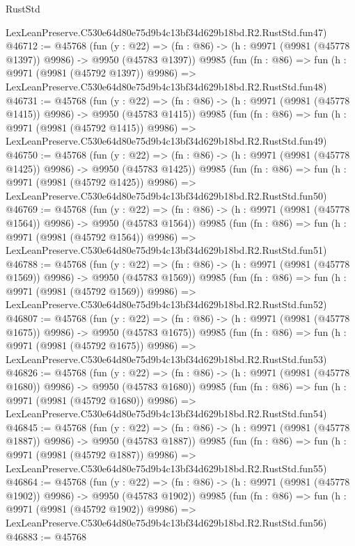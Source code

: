 \begin{lexlean}{RustStd}
\begin{coremodule}
    LexLeanPreserve.C530e64d80e75d9b4c13bf34d629b18bd.R2.RustStd.fun47)
@46712 := @45768
    (fun (y : @22) =>
    (fn : @86) -> (h : @9971 (@9981 (@45778 @1397)) @9986) -> @9950 (@45783 @1397))
    @9985
    (fun (fn : @86) =>
    fun (h : @9971 (@9981 (@45792 @1397)) @9986) =>
    LexLeanPreserve.C530e64d80e75d9b4c13bf34d629b18bd.R2.RustStd.fun48)
@46731 := @45768
    (fun (y : @22) =>
    (fn : @86) -> (h : @9971 (@9981 (@45778 @1415)) @9986) -> @9950 (@45783 @1415))
    @9985
    (fun (fn : @86) =>
    fun (h : @9971 (@9981 (@45792 @1415)) @9986) =>
    LexLeanPreserve.C530e64d80e75d9b4c13bf34d629b18bd.R2.RustStd.fun49)
@46750 := @45768
    (fun (y : @22) =>
    (fn : @86) -> (h : @9971 (@9981 (@45778 @1425)) @9986) -> @9950 (@45783 @1425))
    @9985
    (fun (fn : @86) =>
    fun (h : @9971 (@9981 (@45792 @1425)) @9986) =>
    LexLeanPreserve.C530e64d80e75d9b4c13bf34d629b18bd.R2.RustStd.fun50)
@46769 := @45768
    (fun (y : @22) =>
    (fn : @86) -> (h : @9971 (@9981 (@45778 @1564)) @9986) -> @9950 (@45783 @1564))
    @9985
    (fun (fn : @86) =>
    fun (h : @9971 (@9981 (@45792 @1564)) @9986) =>
    LexLeanPreserve.C530e64d80e75d9b4c13bf34d629b18bd.R2.RustStd.fun51)
@46788 := @45768
    (fun (y : @22) =>
    (fn : @86) -> (h : @9971 (@9981 (@45778 @1569)) @9986) -> @9950 (@45783 @1569))
    @9985
    (fun (fn : @86) =>
    fun (h : @9971 (@9981 (@45792 @1569)) @9986) =>
    LexLeanPreserve.C530e64d80e75d9b4c13bf34d629b18bd.R2.RustStd.fun52)
@46807 := @45768
    (fun (y : @22) =>
    (fn : @86) -> (h : @9971 (@9981 (@45778 @1675)) @9986) -> @9950 (@45783 @1675))
    @9985
    (fun (fn : @86) =>
    fun (h : @9971 (@9981 (@45792 @1675)) @9986) =>
    LexLeanPreserve.C530e64d80e75d9b4c13bf34d629b18bd.R2.RustStd.fun53)
@46826 := @45768
    (fun (y : @22) =>
    (fn : @86) -> (h : @9971 (@9981 (@45778 @1680)) @9986) -> @9950 (@45783 @1680))
    @9985
    (fun (fn : @86) =>
    fun (h : @9971 (@9981 (@45792 @1680)) @9986) =>
    LexLeanPreserve.C530e64d80e75d9b4c13bf34d629b18bd.R2.RustStd.fun54)
@46845 := @45768
    (fun (y : @22) =>
    (fn : @86) -> (h : @9971 (@9981 (@45778 @1887)) @9986) -> @9950 (@45783 @1887))
    @9985
    (fun (fn : @86) =>
    fun (h : @9971 (@9981 (@45792 @1887)) @9986) =>
    LexLeanPreserve.C530e64d80e75d9b4c13bf34d629b18bd.R2.RustStd.fun55)
@46864 := @45768
    (fun (y : @22) =>
    (fn : @86) -> (h : @9971 (@9981 (@45778 @1902)) @9986) -> @9950 (@45783 @1902))
    @9985
    (fun (fn : @86) =>
    fun (h : @9971 (@9981 (@45792 @1902)) @9986) =>
    LexLeanPreserve.C530e64d80e75d9b4c13bf34d629b18bd.R2.RustStd.fun56)
@46883 := @45768

\end{coremodule}
\end{lexlean}
